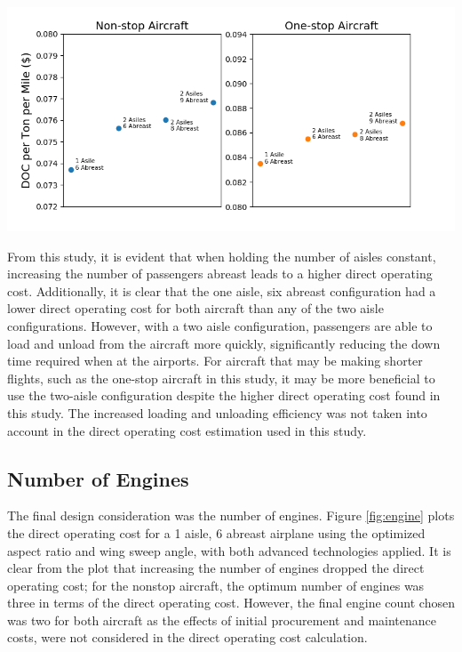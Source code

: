 \documentclass{article}
\begin{document}
        \begin{center}
            \includegraphics[scale=0.7]{seating.PNG}
            \label{fig:seats}
        \end{center}

        \begin{flushleft}
            From this study, it is evident that when holding the number of
            aisles constant, increasing the number of passengers abreast leads
            to a higher direct operating cost. Additionally, it is clear that the
            one aisle, six abreast configuration had a lower direct operating
            cost for both aircraft than any of the two aisle configurations.
            However, with a two aisle configuration, passengers
            are able to load and unload from the aircraft more quickly,
            significantly reducing the down time required when at the airports.
            For aircraft that may be making shorter flights, such as the
            one-stop aircraft in this study, it may be more beneficial to use
            the two-aisle configuration despite the higher direct operating cost
            found in this study. The increased loading and unloading efficiency
            was not taken into account in the direct operating cost estimation
            used in this study.
        \end{flushleft}


    \subsection{Number of Engines}
    \label{sec:engine}
        \begin{flushleft}
            The final design consideration was the number of engines. Figure
            \ref{fig:engine} plots the direct operating cost for a 1 aisle, 6
            abreast airplane using the optimized aspect ratio and wing sweep
            angle, with both advanced technologies applied. It is clear from the
            plot that increasing the number of engines dropped the direct
            operating cost; for the nonstop aircraft, the optimum number of
            engines was three in terms of the direct operating cost. However,
            the final engine count chosen was two for both aircraft as the
            effects of initial procurement and maintenance costs, were not
            considered in the direct operating cost calculation.
        \end{flushleft}
\end{document}
